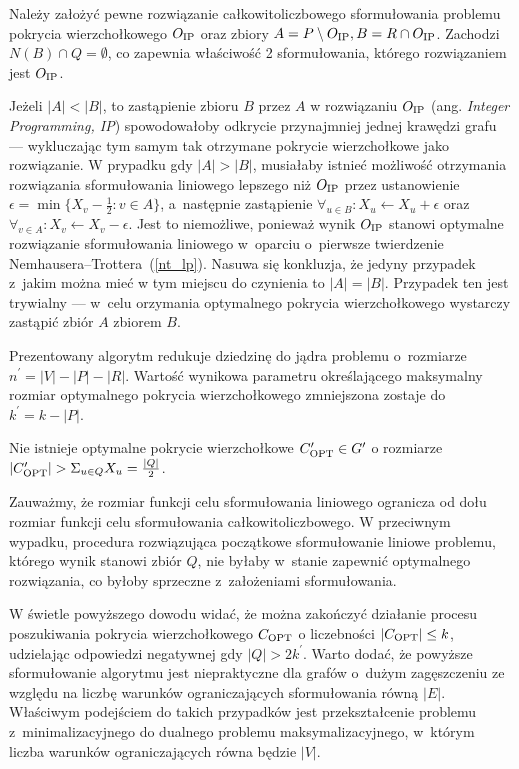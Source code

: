 \begin{bproof}
  Należy założyć pewne rozwiązanie całkowitoliczbowego sformułowania problemu 
  pokrycia wierzchołkowego $O_{\textnormal{IP}}$ oraz zbiory 
  ${A = P \setminus O_{\textnormal{IP}}, B = R \cap O_{\textnormal{IP}}}$.
  Zachodzi $N(B) \cap Q = \emptyset$, co zapewnia właściwość 2 sformułowania, którego rozwiązaniem jest $O_{\textnormal{IP}}$.

  Jeżeli $|A|<|B|$, to zastąpienie zbioru $B$ przez $A$ w rozwiązaniu $O_{\textnormal{IP}}$ (ang. \emph{Integer Programming, IP}) spowodowałoby odkrycie przynajmniej jednej krawędzi grafu --- wykluczając tym samym tak otrzymane pokrycie wierzchołkowe jako rozwiązanie.
  W prypadku gdy $|A|>|B|$, musiałaby istnieć możliwość otrzymania rozwiązania sformułowania liniowego lepszego niż $O_{\textnormal{IP}}$ przez ustanowienie $\epsilon = \min\{X_v-\frac{1}{2}: v \in A\}$, a~następnie
  zastąpienie $\forall_{u \in B}:X_u \leftarrow X_u + \epsilon$ oraz $\forall_{v \in A}: X_v \leftarrow X_v -\epsilon$.
  Jest to niemożliwe, ponieważ wynik $O_{\textnormal{IP}}$ stanowi optymalne rozwiązanie sformułowania liniowego w~oparciu o~pierwsze twierdzenie Nemhausera--Trottera~(\ref{nt_lp}).
  Nasuwa się konkluzja, że jedyny przypadek z~jakim można mieć w tym miejscu do czynienia to $|A|=|B|$.
  Przypadek ten jest trywialny --- w~celu orzymania optymalnego pokrycia wierzchołkowego wystarczy zastąpić zbiór $A$ zbiorem $B$.
\end{bproof}
Prezentowany algorytm redukuje dziedzinę do jądra problemu o~rozmiarze $n^\prime=|V|-|P|-|R|$.
Wartość wynikowa parametru określającego maksymalny rozmiar optymalnego pokrycia wierzchołkowego zmniejszona zostaje do $k^\prime=k-|P|$.
\begin{theorem}
  Nie istnieje optymalne pokrycie wierzchołkowe $C^\prime_{\textnormal{OPT}}\in G^\prime$ o rozmiarze $|C^\prime_{\textnormal{OPT}}|>\Sigma_{u\in Q}X_u=\frac{|Q|}{2}$.
\end{theorem}
\begin{bproof}
  Zauważmy, że rozmiar funkcji celu sformułowania liniowego ogranicza od dołu rozmiar funkcji celu sformułowania całkowitoliczbowego.
  W przeciwnym wypadku, procedura rozwiązująca początkowe sformułowanie liniowe problemu, którego wynik stanowi zbiór $Q$, nie byłaby w~stanie zapewnić optymalnego rozwiązania, co byłoby sprzeczne z~założeniami sformułowania.
\end{bproof}
\par{
  W świetle powyższego dowodu widać, że można zakończyć działanie procesu poszukiwania pokrycia wierzchołkowego $C_{\textnormal{OPT}}$ o liczebności $|C_{\textnormal{OPT}}|\leq k$, udzielając odpowiedzi negatywnej gdy $|Q|>2k^\prime$.
  Warto dodać, że powyższe sformułowanie algorytmu jest niepraktyczne dla grafów o~dużym zagęszczeniu ze względu na liczbę warunków ograniczających sformułowania równą $|E|$.
  Właściwym podejściem do takich przypadków jest przekształcenie problemu z~minimalizacyjnego do dualnego problemu maksymalizacyjnego, w~którym liczba warunków ograniczających równa będzie $|V|$.
}
